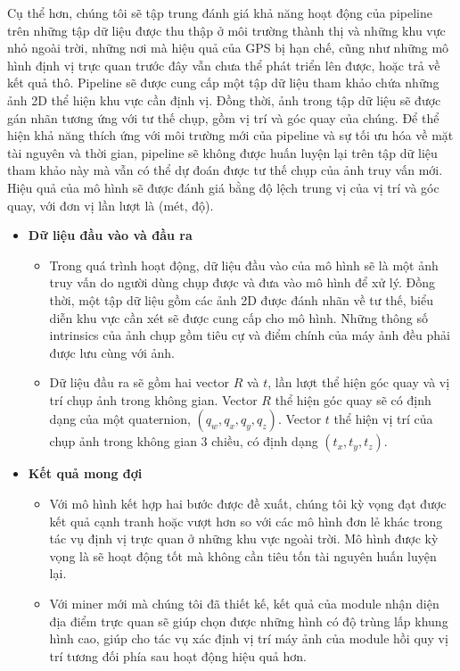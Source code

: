 Cụ thể hơn, chúng tôi sẽ tập trung đánh giá khả năng hoạt động của pipeline trên những tập dữ liệu được thu thập ở môi trường thành thị và những khu vực nhỏ ngoài trời, những nơi mà hiệu quả của GPS bị hạn chế, cũng như những mô hình định vị trực quan trước đây vẫn chưa thể phát triển lên được, hoặc trả về kết quả thô. Pipeline sẽ được cung cấp một tập dữ liệu tham khảo chứa những ảnh 2D thể hiện khu vực cần định vị. Đồng thời, ảnh trong tập dữ liệu sẽ được gán nhãn tương ứng với tư thế chụp, gồm vị trí và góc quay của chúng. Để thể hiện khả năng thích ứng với môi trường mới của pipeline và sự tối ưu hóa về mặt tài nguyên và thời gian, pipeline sẽ không được huấn luyện lại trên tập dữ liệu tham khảo này mà vẫn có thể dự đoán được tư thế chụp của ảnh truy vấn mới. Hiệu quả của mô hình sẽ được đánh giá bằng độ lệch trung vị của vị trí và góc quay, với đơn vị lần lượt là (mét, độ).

\begin{itemize}
    \item \textbf{Dữ liệu đầu vào và đầu ra}
          \begin{itemize}
              \item Trong quá trình hoạt động, dữ liệu đầu vào của mô hình sẽ là một ảnh truy vấn do người dùng chụp được và đưa vào mô hình để xử lý. Đồng thời, một tập dữ liệu gồm các ảnh 2D được đánh nhãn về tư thế, biểu diễn khu vực cần xét sẽ được cung cấp cho mô hình. Những thông số intrinsics của ảnh chụp gồm tiêu cự và điểm chính của máy ảnh đều phải được lưu cùng với ảnh.
              \item Dữ liệu đầu ra sẽ gồm hai vector $R$ và $t$, lần lượt thể hiện góc quay và vị trí chụp ảnh trong không gian. Vector $R$ thể hiện góc quay sẽ có định dạng của một quaternion, $(q_w,q_x,q_y,q_z)$. Vector $t$ thể hiện vị trí của chụp ảnh trong không gian 3 chiều, có định dạng $(t_x,t_y,t_z)$.
          \end{itemize}
    \item \textbf{Kết quả mong đợi}
          \begin{itemize}
			 	\item Với mô hình kết hợp hai bước được đề xuất, chúng tôi kỳ vọng đạt được kết quả cạnh tranh hoặc vượt hơn so với các mô hình đơn lẻ khác trong tác vụ định vị trực quan ở những khu vực ngoài trời. Mô hình được kỳ vọng là sẽ hoạt động tốt mà không cần tiêu tốn tài nguyên huấn luyện lại.
				\item Với miner mới mà chúng tôi đã thiết kế, kết quả của module nhận diện địa điểm trực quan sẽ giúp chọn được những hình có độ trùng lấp khung hình cao, giúp cho tác vụ xác định vị trí máy ảnh của module hồi quy vị trí tương đối phía sau hoạt động hiệu quả hơn.
          \end{itemize}
\end{itemize}

